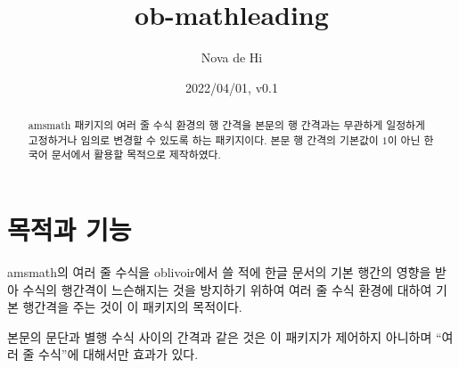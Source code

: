 \documentclass[a4paper,amsmath]{oblivoir}
\newcommand\pkg[1]{\textsf{#1}}
\begin{document}
\title{ob-mathleading}
\author{Nova de Hi}
\date{2022/04/01, v0.1}

\maketitle

\begin{abstract}
\pkg{amsmath} 패키지의 여러 줄 수식 환경의 행 간격을 본문의 행 간격과는 무관하게 일정하게
고정하거나 임의로 변경할 수 있도록 하는 패키지이다. 본문 행 간격의 기본값이 $1$이 아닌 
한국어 문서에서 활용할 목적으로 제작하였다.
\end{abstract}

\tableofcontents*

\section{목적과 기능}

\pkg{amsmath}의 여러 줄 수식을 \pkg{oblivoir}에서 쓸 적에 한글 문서의 기본 행간의 영향을 받아
수식의 행간격이 느슨해지는 것을 방지하기 위하여 여러 줄 수식 환경에 대하여 기본 행간격을 주는 것이 
이 패키지의 목적이다.

본문의 문단과 별행 수식 사이의 간격과 같은 것은 이 패키지가 제어하지 아니하며 ``여러 줄 수식''에 대해서만
효과가 있다.
\end{document}

